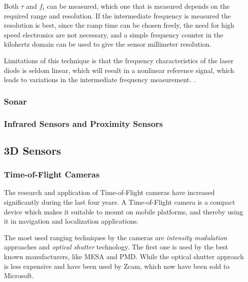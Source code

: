 Both $\tau$ and $f_i$ can be measured, which one that is measured depends on the required
range and resolution. If the intermediate frequency is measured the resolution is best,
since the ramp time can be chosen freely, the need for high speed electronics are not
necessary, and a simple frequency counter in the kilohertz domain can be used to give the
sensor millimeter resolution.

Limitations of this technique is that the frequency characteristics of the laser diode is
seldom linear, which will result in a nonlinear reference signal, which leads to
variations in the intermediate frequency measurement.
\cite{laser-ranging-critical-review}.

\subsubsection{Sonar}


\subsubsection{Infrared Sensors and Proximity Sensors}


\subsection{3D Sensors}


\subsubsection{Time-of-Flight Cameras}
The research and application of Time-of-Flight cameras have increased significantly during the last four
years. A Time-of-Flight camera is a compact device which makes it suitable to mount on
mobile platforms, and thereby using it in navigation and localization applications. 

The most used ranging techniques by the cameras are \emph{intensity modulation} approaches and
\emph{optical shutter} technology. The first one is used by the best known manufacturers,
like MESA and PMD. While the optical shutter approach is less expensive and have been used
by Zcam, which now have been sold to Microsoft. 


